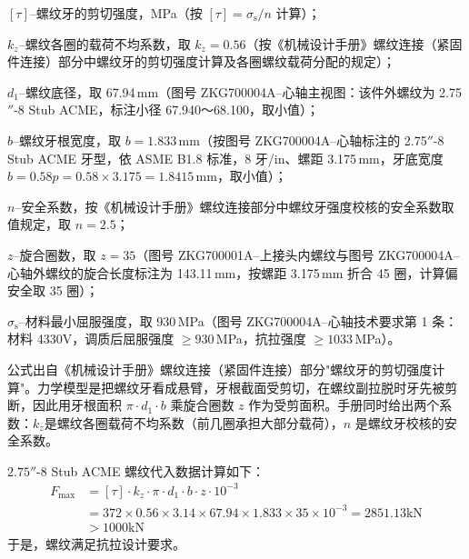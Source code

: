 $[\tau]$--螺纹牙的剪切强度，MPa（按 $[\tau]=\sigma_{\mathrm{s}}/n$ 计算）；

$k_z$--螺纹各圈的载荷不均系数，取 $k_z = 0.56$（按《机械设计手册》螺纹连接（紧固件连接）部分中螺纹牙的剪切强度计算及各圈螺纹载荷分配的规定\cite{ref26}）；

$d_1$--螺纹底径，取 67.94\,mm（图号 ZKG700004A--心轴主视图：该件外螺纹为 2.75$''$-8 Stub ACME，标注小径 67.940～68.100，取小值）；

$b$--螺纹牙根宽度，取 $b=1.833\,\text{mm}$（按图号 ZKG700004A--心轴标注的 2.75$''$-8 Stub ACME 牙型，依 ASME B1.8 标准，8 牙/in、螺距 3.175\,mm，牙底宽度 $b = 0.58p = 0.58 \times 3.175 = 1.8415\,\text{mm}$，取小值）；

$n$--安全系数，按《机械设计手册》螺纹连接部分中螺纹牙强度校核的安全系数取值规定\cite{ref26}，取 $n = 2.5$；

$z$--旋合圈数，取 $z=35$（图号 ZKG700001A--上接头内螺纹与图号 ZKG700004A--心轴外螺纹的旋合长度标注为 143.11\,mm，按螺距 3.175\,mm 折合 45 圈，计算偏安全取 35 圈）；

$\sigma_{\mathrm{s}}$--材料最小屈服强度，取 930\,MPa（图号 ZKG700004A--心轴技术要求第 1 条：材料 4330V，调质后屈服强度 $\ge 930$\,MPa，抗拉强度 $\ge 1033$\,MPa）。

公式出自《机械设计手册》螺纹连接（紧固件连接）部分"螺纹牙的剪切强度计算"。力学模型是把螺纹牙看成悬臂，牙根截面受剪切，在螺纹副拉脱时牙先被剪断，因此用牙根面积 \(\pi \cdot d_1 \cdot b\) 乘旋合圈数 \(z\) 作为受剪面积。手册同时给出两个系数：$k_z$是螺纹各圈载荷不均系数（前几圈承担大部分载荷），$n$ 是螺纹牙校核的安全系数。

$2.75''\text{-}8$ Stub ACME 螺纹代入数据计算如下：
\begin{align}
    F_{\max} &= [\tau] \cdot k_z \cdot \pi \cdot d_1 \cdot b \cdot z \cdot 10^{-3} \nonumber \\
    &= 372 \times 0.56 \times 3.14 \times 67.94 \times 1.833 \times 35 \times 10^{-3} = 2851.13 \text{kN} \\
    &> 1000 \text{kN} \nonumber
\end{align}
于是，螺纹满足抗拉设计要求。

